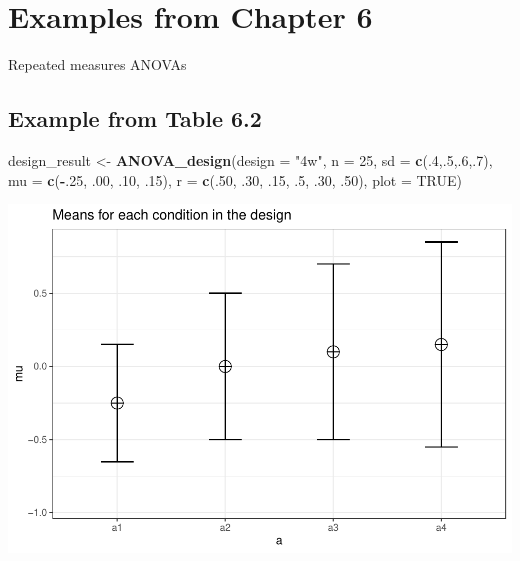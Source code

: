\documentclass[
]{book}
\newenvironment{Shaded}{\begin{snugshade}}{\end{snugshade}}
\newcommand{\DataTypeTok}[1]{\textcolor[rgb]{0.13,0.29,0.53}{#1}}
\newcommand{\DecValTok}[1]{\textcolor[rgb]{0.00,0.00,0.81}{#1}}
\newcommand{\FloatTok}[1]{\textcolor[rgb]{0.00,0.00,0.81}{#1}}
\newcommand{\KeywordTok}[1]{\textcolor[rgb]{0.13,0.29,0.53}{\textbf{#1}}}
\newcommand{\NormalTok}[1]{#1}
\newcommand{\OperatorTok}[1]{\textcolor[rgb]{0.81,0.36,0.00}{\textbf{#1}}}
\newcommand{\OtherTok}[1]{\textcolor[rgb]{0.56,0.35,0.01}{#1}}
\newcommand{\StringTok}[1]{\textcolor[rgb]{0.31,0.60,0.02}{#1}}
\begin{document}
\hypertarget{examples-from-chapter-6}{%
\section{Examples from Chapter 6}\label{examples-from-chapter-6}}

Repeated measures ANOVAs

\hypertarget{example-from-table-6.2}{%
\subsection{Example from Table 6.2}\label{example-from-table-6.2}}

\begin{Shaded}
\begin{Highlighting}[]
\NormalTok{design_result <-}\StringTok{ }\KeywordTok{ANOVA_design}\NormalTok{(}\DataTypeTok{design =} \StringTok{"4w"}\NormalTok{,}
                              \DataTypeTok{n =} \DecValTok{25}\NormalTok{,}
                              \DataTypeTok{sd =} \KeywordTok{c}\NormalTok{(.}\DecValTok{4}\NormalTok{,.}\DecValTok{5}\NormalTok{,.}\DecValTok{6}\NormalTok{,.}\DecValTok{7}\NormalTok{),}
                              \DataTypeTok{mu =} \KeywordTok{c}\NormalTok{(}\OperatorTok{-}\NormalTok{.}\DecValTok{25}\NormalTok{, }\FloatTok{.00}\NormalTok{, }\FloatTok{.10}\NormalTok{, }\FloatTok{.15}\NormalTok{),}
                              \DataTypeTok{r =} \KeywordTok{c}\NormalTok{(.}\DecValTok{50}\NormalTok{, }
                                    \FloatTok{.30}\NormalTok{,}
                                    \FloatTok{.15}\NormalTok{, }
                                    \FloatTok{.5}\NormalTok{,}
                                    \FloatTok{.30}\NormalTok{, }
                                    \FloatTok{.50}\NormalTok{),}
                              \DataTypeTok{plot =} \OtherTok{TRUE}\NormalTok{)}
\end{Highlighting}
\end{Shaded}

\includegraphics{SuperpowerValidation_files/figure-latex/aberson_6.2-1.pdf}
\end{document}
